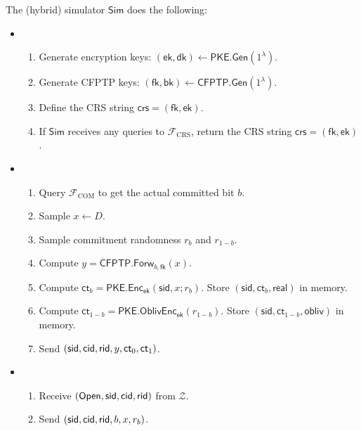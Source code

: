 \documentclass[11pt,letterpaper]{article}
\theoremstyle{plain} %
\theoremstyle{definition} %
\theoremstyle{remark} %
\newcommand{\OpenMsg}{\mathsf{Open}}
\newcommand{\real}{\mathsf{real}}
\newcommand{\obliv}{\mathsf{obliv}}
\newcommand{\Input}{x}
\newcommand{\SecParam}{\lambda}
\newcommand{\PKE}{\mathsf{PKE}}
\newcommand{\Gen}{\mathsf{Gen}}
\newcommand{\Enc}{\mathsf{Enc}}
\newcommand{\OblivEnc}{\mathsf{OblivEnc}}
\newcommand{\EncKey}{\mathsf{ek}}
\newcommand{\DecKey}{\mathsf{dk}}
\newcommand{\Ct}{\mathsf{ct}}
\newcommand{\Rand}{r}
\newcommand{\CFPTP}{\mathsf{CFPTP}}
\newcommand{\Forw}{\mathsf{Forw}}
\newcommand{\ForwKey}{\mathsf{fk}}
\newcommand{\BackKey}{\mathsf{bk}}
\newcommand{\Domain}{D}
\newcommand{\Output}{y}
\newcommand{\Simulator}{{\mathsf{Sim}}} %
\newcommand{\Environment}{{\mathcal{Z}}} %
\newcommand{\IF}{\mathcal{F}} %
\newcommand{\sid}{\mathsf{sid}}
\newcommand{\IFCrs}{\IF_{\mathrm{CRS}}}
\newcommand{\crs}{\mathsf{crs}}
\newcommand{\IFCom}{\IF_{\mathrm{COM}}}
\newcommand{\CommBit}{b}
\begin{document}
The (hybrid) simulator $\Simulator$ does the following:
\begin{itemize}
\item \parhead{Simulate $\IFCrs$}
\begin{enumerate}[nolistsep]
    \item Generate encryption keys: $(\EncKey, \DecKey) \gets \PKE.\Gen(1^{\SecParam})$.
    \item Generate CFPTP keys: $(\ForwKey,\BackKey) \gets \CFPTP.\Gen(1^{\SecParam})$.
    \item Define the CRS string $\crs = (\ForwKey, \EncKey)$.
    \item If $\Simulator$ receives any queries to $\IFCrs$, return the CRS string $\crs = (\ForwKey, \EncKey)$.
\end{enumerate}

\item {}
\begin{enumerate}[nolistsep]
    \item Query $\IFCom$ to get the actual committed bit $\CommBit$.
	\item Sample $\Input \gets \Domain$.
	\item Sample commitment randomness $\Rand_{\CommBit}$ and $\Rand_{1-\CommBit}$.
	\item Compute $\Output = \CFPTP.\Forw_{\CommBit, \ForwKey}(\Input)$.
	\item Compute $\Ct_{\CommBit} = \PKE.\Enc_\EncKey(\sid,\Input; \Rand_\CommBit)$. Store $(\sid,\Ct_{\CommBit},\real)$ in memory.
	\item Compute $\Ct_{1-\CommBit} = \PKE.\OblivEnc_\EncKey(\Rand_{1-\CommBit})$. Store $(\sid,\Ct_{1-\CommBit},\obliv)$ in memory.
	\item Send $(\sid,\CommitterId,\ReceiverId,\Output, \Ct_0, \Ct_1)$.
\end{enumerate}

\item {}
\begin{enumerate}[nolistsep]
\item Receive $(\OpenMsg,\sid,\CommitterId,\ReceiverId)$ from $\Environment$.
\item Send $(\sid,\CommitterId,\ReceiverId,\CommBit, \Input, \Rand_{\CommBit})$.
\end{enumerate}
\end{itemize}


\end{document}
